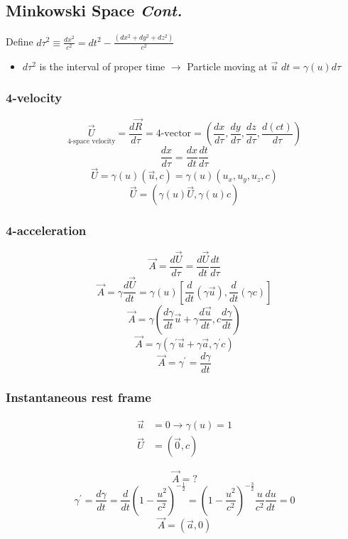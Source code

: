 \documentclass[12pt,a4paper]{article}
\begin{document}
	\subsection{Minkowski Space \textit{Cont.}}
	
	Define $d\tau^2 \equiv \frac{dx^2}{c^2} = dt^2 - \frac{(dx^2 + dy^2 + dz^2)}{c^2}$
	
	\begin{itemize}
		\item $d\tau^2$ is the interval of proper time $\rightarrow$ Particle moving at $\vec{u}$ \textbf{$dt = \gamma(u)d\tau$} 
	\end{itemize}
	
	\subsubsection{4-velocity}
	
	$$\underset{\text{4-space velocity}}{\vec{U}} = \frac{d\vec{R}}{d\tau} = \text{4-vector} = \left(\frac{dx}{d\tau}, \frac{dy}{d\tau}, \frac{dz}{d\tau}, \frac{d(ct)}{d
	\tau}\right)$$
	$$\frac{dx}{d\tau} = \frac{dx}{dt}\frac{dt}{d\tau}$$
	$$\vec{U} = \gamma(u)(\vec{u}, c) = \gamma(u)(u_x, u_y, u_z, c)$$
	$$\vec{U} = (\gamma(u)\vec{U} , \gamma(u)c)$$
	
	\subsubsection{4-acceleration}
	
	$$\vec{A} = \frac{d\vec{U}}{d\tau} = \frac{d\vec{U}}{dt}\frac{dt}{d\tau}$$
	$$\vec{A} = \gamma\frac{d\vec{U}}{dt} = \gamma(u)\left[\frac{d}{dt}\left(\gamma\vec{u}\right), \frac{d}{dt}(\gamma c)\right]$$
	$$\vec{A} = \gamma\left(\frac{d\gamma}{dt}\vec{u} + \gamma\frac{d\vec{u}}{dt}, c\frac{d\gamma}{dt}\right)$$
	$$\vec{A} = \gamma(\gamma^{\prime}\vec{u} + \gamma\vec{a}, \gamma^{\prime}c)$$
	$$\vec{A} = \gamma^{\prime} = \frac{d\gamma}{dt}$$
	
	\subsubsection{Instantaneous rest frame}
	
	\begin{align*}
		\vec{u} &= 0 \rightarrow \gamma(u) = 1\\
		\vec{U} &= (\vec{0}, c)
 	\end{align*}
 	
 	$$\vec{A} = ?$$
 	$$\gamma^{\prime} = \frac{d\gamma}{dt} = \frac{d}{dt}\left(1 - \frac{u^2}{c^2}\right)^{-\frac{1}{2}} = \left(1 - \frac{u^2}{c^2}\right)^{-\frac{3}{2}}\frac{u}{c^2}\frac{du}{dt} = 0$$
 	$$\boxed{\vec{A} = (\vec{a} , 0)}$$
\end{document}
